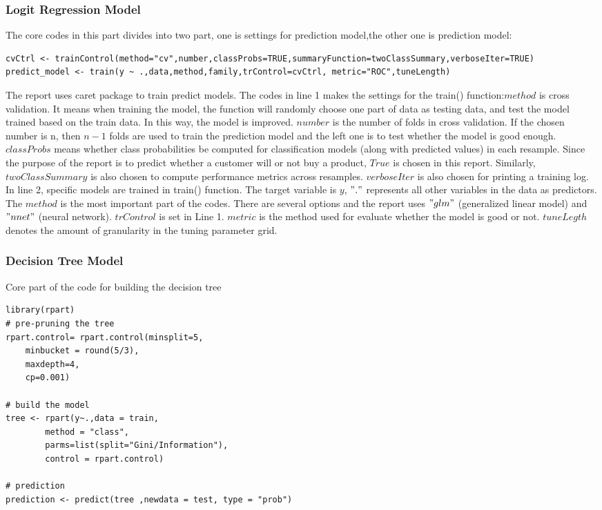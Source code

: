      \subsubsection{Logit Regression Model}
    \noindent The core codes in this part divides into two part, one is settings for prediction model,the other one is prediction model: 
   \begin{lstlisting}
cvCtrl <- trainControl(method="cv",number,classProbs=TRUE,summaryFunction=twoClassSummary,verboseIter=TRUE)
predict_model <- train(y ~ .,data,method,family,trControl=cvCtrl, metric="ROC",tuneLength)
    \end{lstlisting}
    \indent The report uses caret package to train predict models. The codes in line 1 makes the settings for the train() function:$method$ is cross validation. It means when training the model, the function will randomly choose one part of data as testing data, and test the model trained based on the train data. In this way, the model is improved. $number$ is the number of folds in cross validation. If the chosen number is n, then $n-1$ folds are used to train the prediction model and the left one is to test whether the model is good enough.  $classProbs$ means whether class probabilities be computed for classification models (along with predicted values) in each resample. Since the purpose of the report is to predict whether a customer will or not buy a product, $True$ is chosen in this report. Similarly, $twoClassSummary$ is also chosen to compute performance metrics across resamples. $verboseIter$ is also chosen for printing a training log.\\
    [\baselineskip]\indent In line 2, specific models are trained in train() function. The target variable is $y$, $"."$ represents all other variables in the data as predictors. The $method$ is the most important part of the codes. There are several options and the report uses $"glm"$ (generalized linear model) and $"nnet"$ (neural network). $trControl$ is set in Line 1. $metric$ is the method used for evaluate whether the model is good or not. $tuneLegth$ denotes the amount of granularity in the tuning parameter grid.  \\
    \subsubsection{Decision Tree Model}
    \noindent Core part of the code for building the decision tree
    \begin{lstlisting}
library(rpart)
# pre-pruning the tree
rpart.control= rpart.control(minsplit=5, 
	minbucket = round(5/3),
	maxdepth=4, 
	cp=0.001)
   
# build the model
tree <- rpart(y~.,data = train,
		method = "class", 
	   	parms=list(split="Gini/Information"), 
	   	control = rpart.control)

# prediction
prediction <- predict(tree ,newdata = test, type = "prob")
    
    \end{lstlisting}

